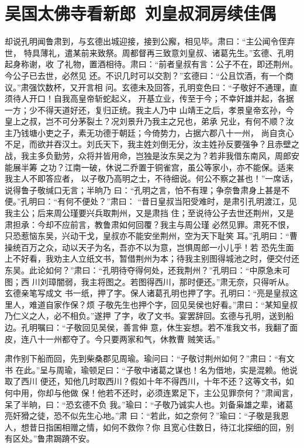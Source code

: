 \chapter{吴国太佛寺看新郎~刘皇叔洞房续佳偶}

却说孔明闻鲁肃到，与玄德出城迎接，接到公廨，相见毕。肃曰：“主公闻令侄弃世，
特具薄礼，遣某前来致祭。周都督再三致意刘皇叔、诸葛先生。”玄德、孔明起身称谢，收
了礼物，置酒相待。肃曰：“前者皇叔有言：公子不在，即还荆州。今公子已去世，必然见
还。不识几时可以交割？”玄德曰：“公且饮酒，有一个商议。”肃强饮数杯，又开言相
问。玄德未及回答，孔明变色曰：“子敬好不通理，直须待人开口！自我高皇帝斩蛇起义，
开基立业，传至于今；不幸奸雄并起，各据一方；少不得天道好还，复归正统。我主人乃中
山靖王之后，孝景皇帝玄孙，今皇上之叔，岂不可分茅裂土？况刘景升乃我主之兄也，弟承
兄业，有何不顺？汝主乃钱塘小吏之子，素无功德于朝廷；今倚势力，占据六郡八十一州，
尚自贪心不足，而欲并吞汉土。刘氏天下，我主姓刘倒无分，汝主姓孙反要强争？且赤壁之
战，我主多负勤劳，众将并皆用命，岂独是汝东吴之为？若非我借东南风，周郎安能展半筹
之功？江南一破，休说二乔置于铜雀宫，虽公等家小，亦不能保。适来我主人不即答应者，
以子敬乃高明之士，不待细说。何公不察之甚也！”一席话，说得鲁子敬缄口无言；半晌乃
曰：“孔明之言，怕不有理；争奈鲁肃身上甚是不便。”孔明曰：“有何不便处？”肃曰：
“昔日皇叔当阳受难时，是肃引孔明渡江，见我主公；后来周公瑾要兴兵取荆州，又是肃挡
住；至说待公子去世还荆州，又是肃担承：今却不应前言，教鲁肃如何回覆？我主与周公瑾
必然见罪。肃死不恨，只恐惹恼东吴，兴动干戈，皇叔亦不能安坐荆州，空为天下耻笑
耳。”孔明曰：“曹操统百万之众，动以天子为名，吾亦不以为意，岂惧周郎一小儿乎！若
恐先生面上不好看，我劝主人立纸文书，暂借荆州为本；待我主别图得城池之时，便交付还
东吴。此论如何？”肃曰：“孔明待夺得何处，还我荆州？”孔明曰：“中原急未可图；西
川刘璋闇弱，我主将图之。若图得西川，那时便还。”肃无奈，只得听从。玄德亲笔写成文
书一纸，押了字。保人诸葛孔明也押了字。孔明曰：“亮是皇叔这里人，难道自家作保？烦
子敬先生也押个字，回见吴侯也好看。”肃曰：“某知皇叔乃仁义之人，必不相负。”遂押
了字，收了文书。宴罢辞回。玄德与孔明，送到船边。孔明嘱曰：“子敬回见吴侯，善言伸
意，休生妄想。若不准我文书，我翻了面皮，连八十一州都夺了。今只要两家和气，休教曹
贼笑话。”

肃作别下船而回，先到柴桑郡见周瑜。瑜问曰：“子敬讨荆州如何？”肃曰：“有文书
在此。”呈与周瑜，瑜顿足曰：“子敬中诸葛之谋也！名为借地，实是混赖。他说取了西川
便还，知他几时取西川？假如十年不得西川，十年不还？这等文书，如何中用，你却与他做
保！他若不还时，必须连累足下，主公见罪奈何？”肃闻言，呆了半晌，曰：“恐玄德不负
我。”瑜曰：“子敬乃诚实人也。刘备枭雄之辈，诸葛亮奸猾之徒，恐不似先生心地。”肃
曰：“若此，如之奈何？”瑜曰：“子敬是我恩人，想昔日指囷相赠之情，如何不救你？你
且宽心住数日，待江北探细的回，别有区处。”鲁肃跼蹐不安。

